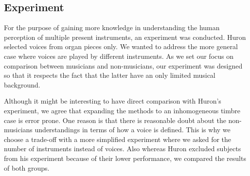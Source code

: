 \subsection{Experiment}
For the purpose of gaining more knowledge in understanding the human perception of multiple present instruments, an experiment was conducted. Huron selected voices from organ pieces only. We wanted to address the more general case where voices are played by different instruments.
As we set our focus on comparison between musicians and non-musicians, our experiment was designed so that it respects the fact that the latter have an only limited musical background.
\par
Although it might be interesting to have direct comparison with Huron's experiment, we agree that expanding the methods to an inhomogeneous timbre case is error prone. One reason is that there is reasonable doubt about the non-musicians understandings in terms of how a voice is defined. This is why we choose a trade-off with a more simplified experiment where we asked for the number of instruments instead of voices. Also whereas Huron \cite{huron89}  excluded subjects from his experiment because of their lower performance, we compared the results of both groups.

